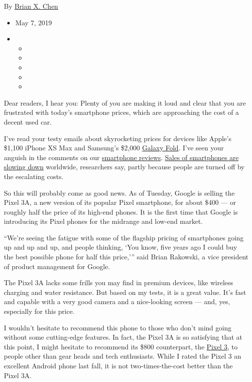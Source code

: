 By \href{https://www.nytimes3xbfgragh.onion/by/brian-x-chen}{Brian X.
Chen}

\begin{itemize}
\item
  May 7, 2019
\item
  \begin{itemize}
  \item
  \item
  \item
  \item
  \item
  \end{itemize}
\end{itemize}

Dear readers, I hear you: Plenty of you are making it loud and clear
that you are frustrated with today's smartphone prices, which are
approaching the cost of a decent used car.

I've read your testy emails about skyrocketing prices for devices like
Apple's \$1,100 iPhone XS Max and Samsung's \$2,000
\href{https://www.nytimes3xbfgragh.onion/2019/04/18/technology/samsung-galaxy-screen.html}{Galaxy
Fold}. I've seen your anguish in the comments on our
\href{https://www.nytimes3xbfgragh.onion/2018/10/23/technology/personaltech/apple-iphone-xr-review.html}{smartphone
reviews}.
\href{https://www.idc.com/getdoc.jsp?containerId=prUS45042319}{Sales of
smartphones are slowing down} worldwide, researchers say, partly because
people are turned off by the escalating costs.

So this will probably come as good news. As of Tuesday, Google is
selling the Pixel 3A, a new version of its popular Pixel smartphone, for
about \$400 --- or roughly half the price of its high-end phones. It is
the first time that Google is introducing its Pixel phones for the
midrange and low-end market.

``We're seeing the fatigue with some of the flagship pricing of
smartphones going up and up and up, and people thinking, `You know, five
years ago I could buy the best possible phone for half this price,'''
said Brian Rakowski, a vice president of product management for Google.

The Pixel 3A lacks some frills you may find in premium devices, like
wireless charging and water resistance. But based on my tests, it is a
great value. It's fast and capable with a very good camera and a
nice-looking screen --- and, yes, especially for this price.

I wouldn't hesitate to recommend this phone to those who don't mind
going without some cutting-edge features. In fact, the Pixel 3A is so
satisfying that at this point, I might hesitate to recommend its \$800
counterpart, the
\href{https://www.nytimes3xbfgragh.onion/2018/10/15/technology/personaltech/google-pixel-3-review.html}{Pixel
3}, to people other than gear heads and tech enthusiasts. While I rated
the Pixel 3 an excellent Android phone last fall, it is not
two-times-the-cost better than the Pixel 3A.

